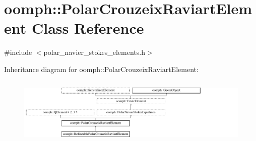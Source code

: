 \hypertarget{classoomph_1_1PolarCrouzeixRaviartElement}{}\section{oomph\+:\+:Polar\+Crouzeix\+Raviart\+Element Class Reference}
\label{classoomph_1_1PolarCrouzeixRaviartElement}


{\ttfamily \#include $<$polar\+\_\+navier\+\_\+stokes\+\_\+elements.\+h$>$}

Inheritance diagram for oomph\+:\+:Polar\+Crouzeix\+Raviart\+Element\+:\begin{figure}[H]
\begin{center}
\leavevmode
\includegraphics[height=3.252033cm]{classoomph_1_1PolarCrouzeixRaviartElement}
\end{center}
\end{figure}
